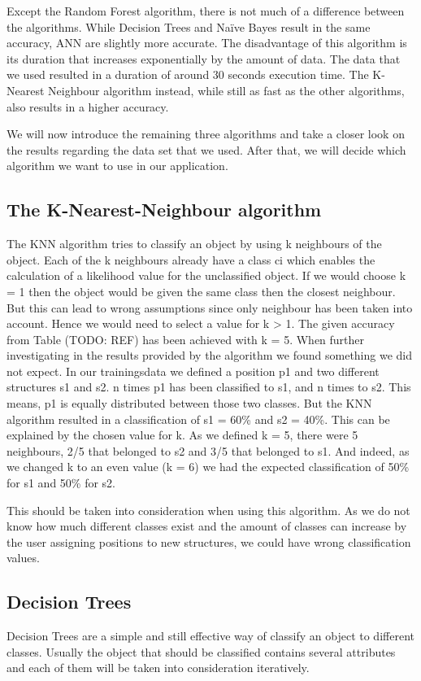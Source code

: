 Except the Random Forest algorithm, there is not much of a difference between the algorithms. While Decision Trees and Na{\"i}ve Bayes result in the same accuracy, ANN are slightly more accurate. The disadvantage of this algorithm is its duration that increases exponentially by the amount of data. The data that we used resulted in a duration of around 30 seconds execution time. The K-Nearest Neighbour algorithm instead, while still as fast as the other algorithms, also results in a higher accuracy.

We will now introduce the remaining three algorithms and take a closer look on the results regarding the data set that we used. After that, we will decide which algorithm we want to use in our application.

\subsection{The K-Nearest-Neighbour algorithm}
\label{sec4.2.1}
The KNN algorithm tries to classify an object by using k neighbours of the object. Each of the k neighbours already have a class ci which enables the calculation of a likelihood value for the unclassified object.
If we would choose k = 1 then the object would be given the same class then the closest neighbour. But this can lead to wrong assumptions since only neighbour has been taken into account. Hence we would need to select a value for k > 1. The given accuracy from Table (TODO: REF) has been achieved with k = 5.
When further investigating in the results provided by the algorithm we found something we did not expect. In our trainingsdata we defined a position p1 and two different structures s1 and s2. n times p1 has been classified to s1, and n times to s2. This means, p1 is equally distributed between those two classes. But the KNN algorithm resulted in a classification of s1 = 60\% and s2 = 40\%. This can be explained by the chosen value for k. As we defined k = 5, there were 5 neighbours, 2/5 that belonged to s2 and 3/5 that belonged to s1. And indeed, as we changed k to an even value (k = 6) we had the expected classification of 50\% for s1 and 50\% for s2.

This should be taken into consideration when using this algorithm. As we do not know how much different classes exist and the amount of classes can increase by the user assigning positions to new structures, we could have wrong classification values.

\subsection{Decision Trees}
\label{sec4.2.2}
Decision Trees are a simple and still effective way of classify an object to different classes. Usually the object that should be classified contains several attributes and each of them will be taken into consideration iteratively.

